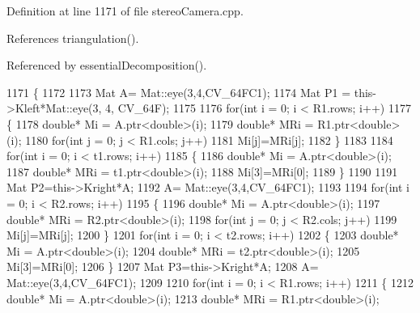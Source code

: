 Definition at line 1171 of file stereo\+Camera.\+cpp.



References triangulation().



Referenced by essential\+Decomposition().


\begin{DoxyCode}
1171                                                                                                            
                                 \{
1172 
1173     Mat A= Mat::eye(3,4,CV\_64FC1);
1174     Mat P1 = this->Kleft*Mat::eye(3, 4, CV\_64F);
1175 
1176     \textcolor{keywordflow}{for}(\textcolor{keywordtype}{int} i = 0; i < R1.rows; i++)
1177     \{
1178         \textcolor{keywordtype}{double}* Mi = A.ptr<\textcolor{keywordtype}{double}>(i);
1179         \textcolor{keywordtype}{double}* MRi = R1.ptr<\textcolor{keywordtype}{double}>(i);
1180         \textcolor{keywordflow}{for}(\textcolor{keywordtype}{int} j = 0; j < R1.cols; j++)
1181             Mi[j]=MRi[j];
1182     \}
1183 
1184     \textcolor{keywordflow}{for}(\textcolor{keywordtype}{int} i = 0; i < t1.rows; i++)
1185     \{
1186         \textcolor{keywordtype}{double}* Mi = A.ptr<\textcolor{keywordtype}{double}>(i);
1187         \textcolor{keywordtype}{double}* MRi = t1.ptr<\textcolor{keywordtype}{double}>(i);
1188         Mi[3]=MRi[0];
1189     \}
1190 
1191     Mat P2=this->Kright*A;
1192     A= Mat::eye(3,4,CV\_64FC1);
1193 
1194     \textcolor{keywordflow}{for}(\textcolor{keywordtype}{int} i = 0; i < R2.rows; i++)
1195     \{
1196         \textcolor{keywordtype}{double}* Mi = A.ptr<\textcolor{keywordtype}{double}>(i);
1197         \textcolor{keywordtype}{double}* MRi = R2.ptr<\textcolor{keywordtype}{double}>(i);
1198         \textcolor{keywordflow}{for}(\textcolor{keywordtype}{int} j = 0; j < R2.cols; j++)
1199             Mi[j]=MRi[j];
1200     \}
1201     \textcolor{keywordflow}{for}(\textcolor{keywordtype}{int} i = 0; i < t2.rows; i++)
1202     \{
1203         \textcolor{keywordtype}{double}* Mi = A.ptr<\textcolor{keywordtype}{double}>(i);
1204         \textcolor{keywordtype}{double}* MRi = t2.ptr<\textcolor{keywordtype}{double}>(i);
1205         Mi[3]=MRi[0];
1206     \}
1207     Mat P3=this->Kright*A;
1208     A= Mat::eye(3,4,CV\_64FC1);
1209 
1210     \textcolor{keywordflow}{for}(\textcolor{keywordtype}{int} i = 0; i < R1.rows; i++)
1211     \{
1212         \textcolor{keywordtype}{double}* Mi = A.ptr<\textcolor{keywordtype}{double}>(i);
1213         \textcolor{keywordtype}{double}* MRi = R1.ptr<\textcolor{keywordtype}{double}>(i);

\end{DoxyCode}
